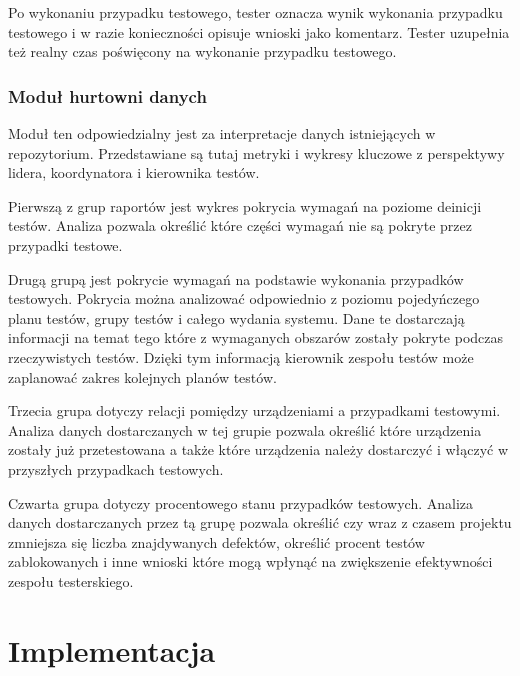 Po wykonaniu przypadku testowego, tester oznacza wynik wykonania przypadku testowego i w razie konieczności opisuje wnioski jako komentarz. Tester uzupełnia też realny czas poświęcony na wykonanie przypadku testowego.

\subsection{ Moduł hurtowni danych  }

Moduł ten odpowiedzialny jest za interpretacje danych istniejących w repozytorium. Przedstawiane są tutaj metryki i wykresy kluczowe z perspektywy lidera, koordynatora i kierownika testów.

Pierwszą z grup raportów jest wykres pokrycia wymagań na poziome deinicji testów. Analiza pozwala określić które części wymagań nie są pokryte przez przypadki testowe.

Drugą grupą jest pokrycie wymagań na podstawie wykonania przypadków testowych. Pokrycia można analizować odpowiednio z poziomu pojedyńczego planu testów, grupy testów i całego wydania systemu. Dane te dostarczają informacji na temat tego które z wymaganych obszarów zostały pokryte podczas rzeczywistych testów. Dzięki tym informacją kierownik zespołu testów może zaplanować zakres kolejnych planów testów.

Trzecia grupa dotyczy relacji pomiędzy urządzeniami a przypadkami testowymi. Analiza danych dostarczanych w tej grupie pozwala określić które urządzenia zostały już przetestowana a także które urządzenia należy dostarczyć i włączyć w przyszłych przypadkach testowych.

Czwarta grupa dotyczy procentowego stanu przypadków testowych. Analiza danych dostarczanych przez tą grupę pozwala określić czy wraz z czasem projektu zmniejsza się liczba znajdywanych defektów, określić procent testów zablokowanych i inne wnioski które mogą wpłynąć na zwiększenie efektywności zespołu testerskiego.



\chapter{Implementacja}

